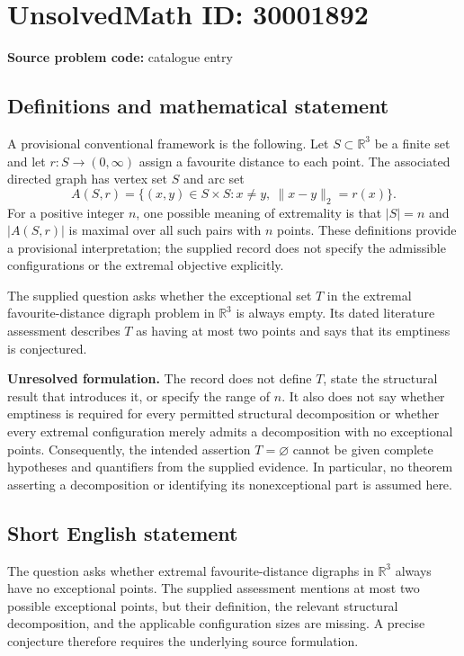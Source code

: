\documentclass[11pt]{article}
\newcommand{\R}{\mathbb{R}}
\begin{document}
\section*{UnsolvedMath ID: 30001892}
\textbf{Source problem code:} catalogue entry
\subsection{Definitions and mathematical statement}
A provisional conventional framework is the following. Let \(S\subset\R^3\) be a finite set and let \(r:S\to(0,\infty)\) assign a favourite distance to each point. The associated directed graph has vertex set \(S\) and arc set
\[
A(S,r)=\{(x,y)\in S\times S:x\ne y,\ \|x-y\|_2=r(x)\}.
\]
For a positive integer \(n\), one possible meaning of extremality is that \(|S|=n\) and \(|A(S,r)|\) is maximal over all such pairs with \(n\) points. These definitions provide a provisional interpretation; the supplied record does not specify the admissible configurations or the extremal objective explicitly.

The supplied question asks whether the exceptional set \(T\) in the extremal favourite-distance digraph problem in \(\R^3\) is always empty. Its dated literature assessment describes \(T\) as having at most two points and says that its emptiness is conjectured.

\textbf{Unresolved formulation.} The record does not define \(T\), state the structural result that introduces it, or specify the range of \(n\). It also does not say whether emptiness is required for every permitted structural decomposition or whether every extremal configuration merely admits a decomposition with no exceptional points. Consequently, the intended assertion \(T=\varnothing\) cannot be given complete hypotheses and quantifiers from the supplied evidence. In particular, no theorem asserting a decomposition or identifying its nonexceptional part is assumed here.
\subsection{Short English statement}
The question asks whether extremal favourite-distance digraphs in \(\R^3\) always have no exceptional points. The supplied assessment mentions at most two possible exceptional points, but their definition, the relevant structural decomposition, and the applicable configuration sizes are missing. A precise conjecture therefore requires the underlying source formulation.
\end{document}
